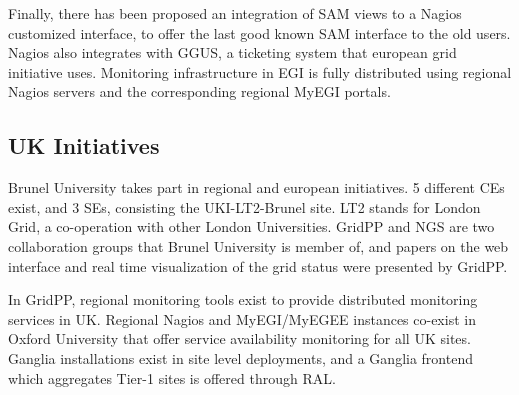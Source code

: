 Finally, there has been proposed an integration of \ac{SAM} views to a Nagios customized interface, to offer the last good known \ac{SAM} interface to the old users. Nagios also integrates with \ac{GGUS}, a ticketing system that european grid initiative uses. Monitoring infrastructure in EGI is fully distributed using regional Nagios servers and the corresponding regional MyEGI portals.

\subsection{UK Initiatives}
Brunel University takes part in regional and european initiatives. 5 different \acp{CE} exist, and 3 \acp{SE}, consisting the UKI-LT2-Brunel site. LT2 stands for London Grid, a co-operation with other London Universities. \ac{GridPP} and \ac{NGS} are two collaboration groups that Brunel University is member of, and papers on the web interface \cite{Hobson2007} and real time visualization of the grid status were presented \cite{Huang2007} by \ac{GridPP}.

In \ac{GridPP}, regional monitoring tools exist to provide distributed monitoring services in UK. Regional Nagios and MyEGI/MyEGEE instances co-exist in Oxford University that offer service availability monitoring for all UK sites. Ganglia installations exist in site level deployments, and a Ganglia frontend which aggregates Tier-1 sites is offered through \ac{RAL}.
